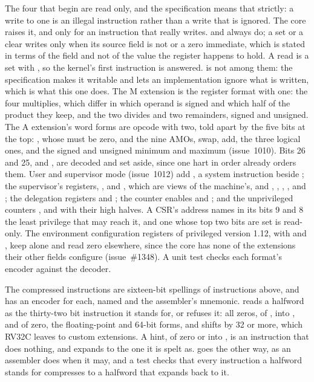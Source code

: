 \documentclass[journal,onecolumn,9pt]{IEEEtran}
\begin{document}
The four that begin  are read only, and the specification
means that strictly: a write to one is an illegal instruction rather
than a write that is ignored. The core raises it, and only for an
instruction that really writes.  and  always
do; a set or a clear writes only when its source field is not
 or a zero immediate, which is stated in terms of the field
and not of the value the register happens to hold. A read is a set
with , so the kernel's first instruction is answered.
 is not among them: the specification makes it writable and
lets an implementation ignore what is written, which is what this one
does. The M extension is the
register format with  one: the four multiplies, which
differ in which operand is signed and which half of the product they
keep, and the two divides and two remainders, signed and unsigned. The
A extension's word forms are opcode  with 
two, told apart by the five bits at the top: , whose
 must be zero,  and the nine AMOs, swap, add,
the three logical ones, and the signed and unsigned minimum and
maximum (issue~1010). Bits 26 and 25,  and , are
decoded and set aside, since one hart in order already orders them.
User and supervisor mode (issue~1012) add , a system
instruction beside ; the supervisor's registers,
,  and , which are views of the
machine's, and , , ,
,  and ; the delegation registers
 and ; the counter enables
 and ; and the unprivileged
counters ,  and  with their high
halves. A CSR's address names in its bits 9 and 8 the least privilege
that may reach it, and one whose top two bits are set is read-only.
The environment configuration registers of privileged version 1.12,
 with  and , keep
 alone and read zero elsewhere, since the core has none of
the extensions their other fields configure (issue~\#1348).
A unit test checks each format's encoder against the decoder.

The compressed instructions are sixteen-bit spellings of instructions
above, and  has an encoder for each, named  and
the assembler's mnemonic.  reads a halfword as the
thirty-two bit instruction it stands for, or refuses it: all zeros,
 of ,  into , 
and  of zero, the floating-point and 64-bit forms,
and shifts by 32 or more, which RV32C leaves to custom extensions. A
hint,  of zero or  into , is an
instruction that does nothing, and expands to the one it is spelt
as.  goes the other way, as an assembler does when it
may, and a test checks that every instruction a halfword stands for
compresses to a halfword that expands back to it.
\end{document}
